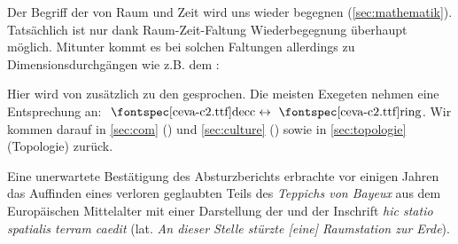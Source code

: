 Der Begriff der  von Raum und Zeit wird uns wieder begegnen (\cref{sec:mathematik}). Tatsächlich ist nur dank Raum-Zeit-Faltung Wiederbegegnung überhaupt möglich. Mitunter kommt es bei solchen Faltungen allerdings zu Dimensionsdurchgängen wie z.B. dem :

Hier wird von  zusätzlich zu den  gesprochen. Die meisten Exe\-ge\-ten nehmen eine Entsprechung an: $\text{\ceva{decc}} \leftrightarrow \text{\ceva{ring}}$. Wir kommen darauf in \cref{sec:com} () und \cref{sec:culture} () sowie in \cref{sec:topologie} (Topologie) zurück.

Eine unerwartete Bestätigung des Absturzberichts erbrachte vor einigen Jahren das Auffinden eines verloren geglaubten Teils des \emph{Teppichs von Bayeux} aus dem Europäischen Mittelalter mit einer Darstellung der  und der Inschrift \emph{hic statio spatialis terram caedit} (lat. \emph{An dieser Stelle stürzte [eine] Raumstation zur Erde}).

